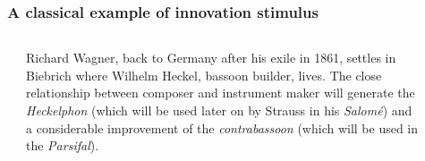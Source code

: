 \begin{frame}
		\frametitle{A classical example of innovation stimulus}

    \begin{columns}[T]
        \begin{column}{0.2\textwidth}
        \end{column}
        \begin{column}{0.5\textwidth}
						Richard Wagner, back to Germany after his exile in 1861,
						settles in Biebrich where Wilhelm Heckel, bassoon builder, lives.
						The close relationship between composer and instrument maker
						will generate the \emph{Heckelphon} (which will be used later on
						by Strauss in his \emph{Salom\'e}) and a considerable improvement
						of the \emph{contrabassoon} (which will be used in the
						\emph{Parsifal}).
        \end{column}
        \begin{column}{0.05\textwidth}
        \end{column}
        \begin{column}{0.1\textwidth}
        \end{column}
    \end{columns}
\end{frame}

